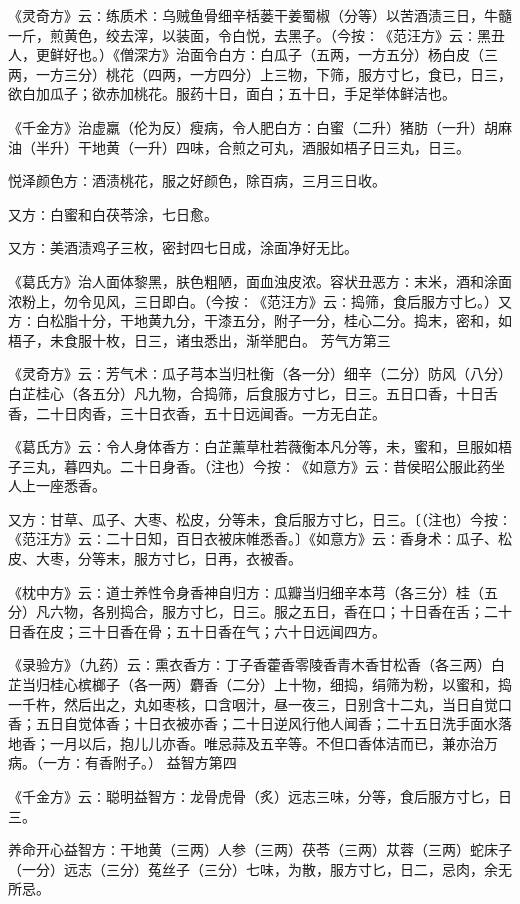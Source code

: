 \documentclass[a4paper,12pt,UTF8,twoside]{ctexbook}
\begin{document}
《灵奇方》云∶练质术∶乌贼鱼骨细辛栝蒌干姜蜀椒（分等）以苦酒渍三日，牛髓一斤，煎黄色，绞去滓，以装面，令白悦，去黑子。（今按∶《范汪方》云∶黑丑人，更鲜好也。）《僧深方》治面令白方∶白瓜子（五两，一方五分）杨白皮（三两，一方三分）桃花（四两，一方四分）上三物，下筛，服方寸匕，食已，日三，欲白加瓜子；欲赤加桃花。服药十日，面白；五十日，手足举体鲜洁也。

《千金方》治虚羸（伦为反）瘦病，令人肥白方∶白蜜（二升）猪肪（一升）胡麻油（半升）干地黄（一升）四味，合煎之可丸，酒服如梧子日三丸，日三。

悦泽颜色方∶酒渍桃花，服之好颜色，除百病，三月三日收。

又方∶白蜜和白茯苓涂，七日愈。

又方∶美酒渍鸡子三枚，密封四七日成，涂面净好无比。

《葛氏方》治人面体黎黑，肤色粗陋，面血浊皮浓。容状丑恶方∶末米，酒和涂面浓粉上，勿令见风，三日即白。（今按∶《范汪方》云∶捣筛，食后服方寸匕。）又方∶白松脂十分，干地黄九分，干漆五分，附子一分，桂心二分。捣末，密和，如梧子，未食服十枚，日三，诸虫悉出，渐举肥白。
芳气方第三

《灵奇方》云∶芳气术∶瓜子芎本当归杜衡（各一分）细辛（二分）防风（八分）白芷桂心（各五分）凡九物，合捣筛，后食服方寸匕，日三。五日口香，十日舌香，二十日肉香，三十日衣香，五十日远闻香。一方无白芷。

《葛氏方》云∶令人身体香方∶白芷薰草杜若薇衡本凡分等，未，蜜和，旦服如梧子三丸，暮四丸。二十日身香。（注也）今按∶《如意方》云∶昔侯昭公服此药坐人上一座悉香。

又方∶甘草、瓜子、大枣、松皮，分等未，食后服方寸匕，日三。〔（注也）今按∶《范汪方》云∶二十日知，百日衣被床帷悉香。〕《如意方》云∶香身术∶瓜子、松皮、大枣，分等末，服方寸匕，日再，衣被香。

《枕中方》云∶道士养性令身香神自归方∶瓜瓣当归细辛本芎（各三分）桂（五分）凡六物，各别捣合，服方寸匕，日三。服之五日，香在口；十日香在舌；二十日香在皮；三十日香在骨；五十日香在气；六十日远闻四方。

《录验方》（九药）云∶熏衣香方∶丁子香藿香零陵香青木香甘松香（各三两）白芷当归桂心槟榔子（各一两）麝香（二分）上十物，细捣，绢筛为粉，以蜜和，捣一千杵，然后出之，丸如枣核，口含咽汁，昼一夜三，日别含十二丸，当日自觉口香；五日自觉体香；十日衣被亦香；二十日逆风行他人闻香；二十五日洗手面水落地香；一月以后，抱儿儿亦香。唯忌蒜及五辛等。不但口香体洁而已，兼亦治万病。（一方∶有香附子。）
益智方第四

《千金方》云∶聪明益智方∶龙骨虎骨（炙）远志三味，分等，食后服方寸匕，日三。

养命开心益智方∶干地黄（三两）人参（三两）茯苓（三两）苁蓉（三两）蛇床子（一分）远志（三分）菟丝子（三分）七味，为散，服方寸匕，日二，忌肉，余无所忌。
\end{document}
